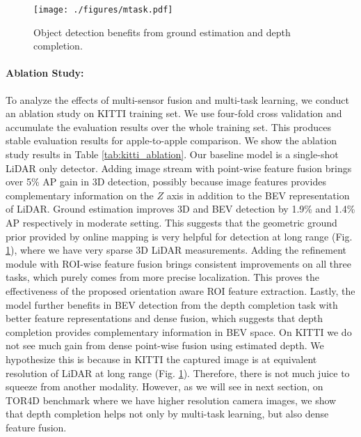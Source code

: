 \documentclass[10pt,twocolumn,letterpaper]{article}
\begin{document}
\begin{figure}[t]
\begin{center}
\texttt{[image: ./figures/mtask.pdf]}
\end{center}
   \caption{Object detection benefits from ground estimation and depth completion.}
\label{fig:mtask}
\end{figure}


\paragraph{Ablation Study:}
To analyze the effects of multi-sensor fusion and multi-task learning, we conduct an ablation study on KITTI training set. We use four-fold cross validation and accumulate the evaluation results over the whole training set. This produces stable evaluation results for apple-to-apple comparison. We show the ablation study results in Table \ref{tab:kitti_ablation}.
Our baseline model is a single-shot LiDAR only detector. Adding image stream with point-wise feature fusion brings over 5\% AP gain in 3D detection, possibly because image features provides complementary information on the $Z$ axis in addition to the BEV representation of LiDAR. 
Ground estimation improves 3D and BEV detection by 1.9\% and 1.4\% AP respectively in moderate setting. This suggests that the geometric ground prior provided by online mapping is very helpful for detection at long range (Fig. \ref{fig:mtask}), where we have very sparse 3D LiDAR measurements. 
Adding the refinement module with ROI-wise feature fusion brings consistent improvements on all three tasks, which purely comes from more precise localization. This proves the effectiveness of the proposed orientation aware ROI feature extraction. 
Lastly, the model further benefits in BEV detection from the depth completion task with better feature representations and dense fusion, which suggests that depth completion provides  complementary information in BEV space. On KITTI we do not see much gain from dense point-wise fusion using estimated depth. We hypothesize  this is   because in KITTI the captured image is at equivalent resolution of LiDAR at long range (Fig. \ref{fig:mtask}).  Therefore, there is not much juice to squeeze from another modality. However, as we will see in next section, on TOR4D benchmark where we have higher resolution camera images, we show that depth completion helps not only by multi-task learning, but also dense feature fusion.
\end{document}
